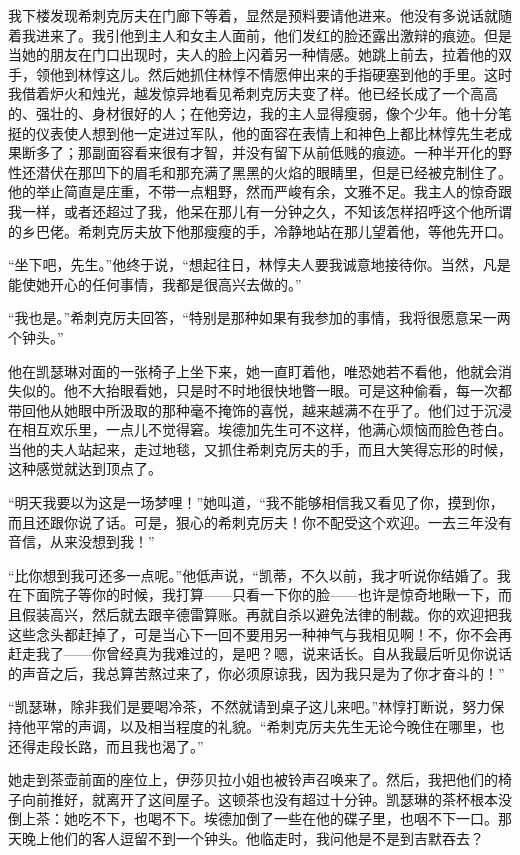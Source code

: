 \par 我下楼发现希刺克厉夫在门廊下等着，显然是预料要请他进来。他没有多说话就随着我进来了。我引他到主人和女主人面前，他们发红的脸还露出激辩的痕迹。但是当她的朋友在门口出现时，夫人的脸上闪着另一种情感。她跳上前去，拉着他的双手，领他到林惇这儿。然后她抓住林惇不情愿伸出来的手指硬塞到他的手里。这时我借着炉火和烛光，越发惊异地看见希刺克厉夫变了样。他已经长成了一个高高的、强壮的、身材很好的人；在他旁边，我的主人显得瘦弱，像个少年。他十分笔挺的仪表使人想到他一定进过军队，他的面容在表情上和神色上都比林惇先生老成果断多了；那副面容看来很有才智，并没有留下从前低贱的痕迹。一种半开化的野性还潜伏在那凹下的眉毛和那充满了黑黑的火焰的眼睛里，但是已经被克制住了。他的举止简直是庄重，不带一点粗野，然而严峻有余，文雅不足。我主人的惊奇跟我一样，或者还超过了我，他呆在那儿有一分钟之久，不知该怎样招呼这个他所谓的乡巴佬。希刺克厉夫放下他那瘦瘦的手，冷静地站在那儿望着他，等他先开口。
\par “坐下吧，先生。”他终于说，“想起往日，林惇夫人要我诚意地接待你。当然，凡是能使她开心的任何事情，我都是很高兴去做的。”
\par “我也是。”希刺克厉夫回答，“特别是那种如果有我参加的事情，我将很愿意呆一两个钟头。”
\par 他在凯瑟琳对面的一张椅子上坐下来，她一直盯着他，唯恐她若不看他，他就会消失似的。他不大抬眼看她，只是时不时地很快地瞥一眼。可是这种偷看，每一次都带回他从她眼中所汲取的那种毫不掩饰的喜悦，越来越满不在乎了。他们过于沉浸在相互欢乐里，一点儿不觉得窘。埃德加先生可不这样，他满心烦恼而脸色苍白。当他的夫人站起来，走过地毯，又抓住希刺克厉夫的手，而且大笑得忘形的时候，这种感觉就达到顶点了。
\par “明天我要以为这是一场梦哩！”她叫道，“我不能够相信我又看见了你，摸到你，而且还跟你说了话。可是，狠心的希刺克厉夫！你不配受这个欢迎。一去三年没有音信，从来没想到我！”
\par “比你想到我可还多一点呢。”他低声说，“凯蒂，不久以前，我才听说你结婚了。我在下面院子等你的时候，我打算——只看一下你的脸——也许是惊奇地瞅一下，而且假装高兴，然后就去跟辛德雷算账。再就自杀以避免法律的制裁。你的欢迎把我这些念头都赶掉了，可是当心下一回不要用另一种神气与我相见啊！不，你不会再赶走我了——你曾经真为我难过的，是吧？嗯，说来话长。自从我最后听见你说话的声音之后，我总算苦熬过来了，你必须原谅我，因为我只是为了你才奋斗的！”
\par “凯瑟琳，除非我们是要喝冷茶，不然就请到桌子这儿来吧。”林惇打断说，努力保持他平常的声调，以及相当程度的礼貌。“希刺克厉夫先生无论今晚住在哪里，也还得走段长路，而且我也渴了。”
\par 她走到茶壶前面的座位上，伊莎贝拉小姐也被铃声召唤来了。然后，我把他们的椅子向前推好，就离开了这间屋子。这顿茶也没有超过十分钟。凯瑟琳的茶杯根本没倒上茶：她吃不下，也喝不下。埃德加倒了一些在他的碟子里，也咽不下一口。那天晚上他们的客人逗留不到一个钟头。他临走时，我问他是不是到吉默吞去？
